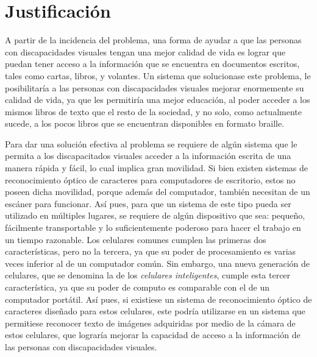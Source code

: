 \documentclass[a4paper, 11pt, oneside]{article}
\begin{document}
	\section{Justificación}
	A partir de la incidencia del problema, una forma de ayudar a que las personas con discapacidades visuales tengan una mejor calidad de vida es lograr que puedan tener acceso a la información que se encuentra en documentos escritos, tales como cartas, libros, y volantes. Un sistema que solucionase este problema, le posibilitaría a las personas con discapacidades visuales mejorar enormemente su calidad de vida, ya que les permitiría una mejor educación, al poder acceder a los mismos libros de texto que el resto de la sociedad, y no solo, como actualmente sucede, a los pocos libros que se encuentran disponibles en formato braille.

	Para dar una solución efectiva al problema se requiere de algún sistema que le permita a los discapacitados visuales acceder a la información escrita de una manera rápida y fácil, lo cual implica gran movilidad. Si bien existen sistemas de reconocimiento óptico de caracteres para computadores de escritorio, estos no poseen dicha movilidad, porque además del computador, también necesitan de un escáner para funcionar. Así pues, para que un sistema de este tipo pueda ser utilizado en múltiples lugares, se requiere de algún dispositivo que sea: pequeño, fácilmente transportable y lo suficientemente poderoso para hacer el trabajo en un tiempo razonable. Los celulares comunes cumplen las primeras dos características, pero no la tercera, ya que su poder de procesamiento es varias veces inferior al de un computador común. Sin embargo, una nueva generación de celulares, que se denomina la de los \textit{celulares inteligentes}, cumple esta tercer característica, ya que su poder de computo es comparable con el de un computador portátil. Así pues, si existiese un sistema de reconocimiento óptico de caracteres diseñado para estos celulares, este podría utilizarse en un sistema que permitiese reconocer texto de imágenes adquiridas por medio de la cámara de estos celulares, que lograría mejorar la capacidad de acceso a la información de las personas con discapacidades visuales.
\end{document}
